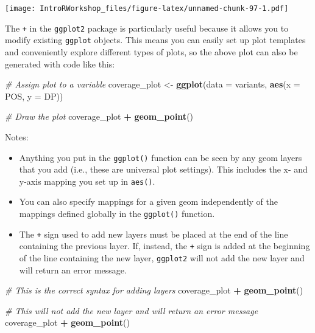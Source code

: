 \documentclass[
]{book}
\newenvironment{Shaded}{\begin{snugshade}}{\end{snugshade}}
\newcommand{\AttributeTok}[1]{\textcolor[rgb]{0.13,0.29,0.53}{#1}}
\newcommand{\CommentTok}[1]{\textcolor[rgb]{0.56,0.35,0.01}{\textit{#1}}}
\newcommand{\FunctionTok}[1]{\textcolor[rgb]{0.13,0.29,0.53}{\textbf{#1}}}
\newcommand{\NormalTok}[1]{#1}
\newcommand{\OtherTok}[1]{\textcolor[rgb]{0.56,0.35,0.01}{#1}}
\newcommand{\SpecialCharTok}[1]{\textcolor[rgb]{0.81,0.36,0.00}{\textbf{#1}}}
\providecommand{\tightlist}{%
  \setlength{\itemsep}{0pt}\setlength{\parskip}{0pt}}
\begin{document}
\texttt{[image: IntroRWorkshop\_files/figure-latex/unnamed-chunk-97-1.pdf]}

The \texttt{+} in the \texttt{ggplot2} package is particularly useful because it allows you to modify existing \texttt{ggplot} objects. This means you can easily set up plot templates and conveniently explore different types of plots, so the above plot can also be generated with code like this:

\begin{Shaded}
\begin{Highlighting}[]
\CommentTok{\# Assign plot to a variable}
\NormalTok{coverage\_plot }\OtherTok{\textless{}{-}} \FunctionTok{ggplot}\NormalTok{(}\AttributeTok{data =}\NormalTok{ variants, }\FunctionTok{aes}\NormalTok{(}\AttributeTok{x =}\NormalTok{ POS, }\AttributeTok{y =}\NormalTok{ DP))}

\CommentTok{\# Draw the plot}
\NormalTok{coverage\_plot }\SpecialCharTok{+}
    \FunctionTok{geom\_point}\NormalTok{()}
\end{Highlighting}
\end{Shaded}

Notes:

\begin{itemize}
\tightlist
\item
  Anything you put in the \texttt{ggplot()} function can be seen by any geom layers that you add (i.e., these are universal plot settings). This includes the x- and y-axis mapping you set up in \texttt{aes()}.
\item
  You can also specify mappings for a given geom independently of the mappings defined globally in the \texttt{ggplot()} function.
\item
  The \texttt{+} sign used to add new layers must be placed at the end of the line containing the previous layer. If, instead, the \texttt{+} sign is added at the beginning of the line containing the new layer, \texttt{ggplot2} will not add the new layer and will return an error message.
\end{itemize}

\begin{Shaded}
\begin{Highlighting}[]
\CommentTok{\# This is the correct syntax for adding layers}
\NormalTok{coverage\_plot }\SpecialCharTok{+}
  \FunctionTok{geom\_point}\NormalTok{()}

\CommentTok{\# This will not add the new layer and will return an error message}
\NormalTok{coverage\_plot}
  \SpecialCharTok{+} \FunctionTok{geom\_point}\NormalTok{()}
\end{Highlighting}
\end{Shaded}
\end{document}
